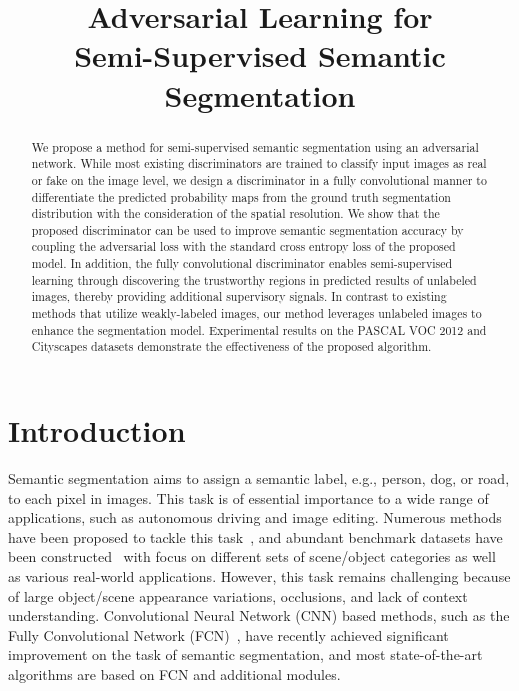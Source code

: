 \documentclass{bmvc2k}
\title{Adversarial Learning for \\
	Semi-Supervised Semantic Segmentation}
\begin{document}
	
	\maketitle
	
	\begin{abstract}
		
		We propose a method for semi-supervised semantic segmentation using an adversarial network.
While most existing discriminators are trained to classify input images as real or fake on the image level, we design a discriminator in a fully convolutional manner to differentiate the predicted probability maps from the ground truth segmentation distribution with the consideration of the spatial resolution.
We show that the proposed discriminator can be used to improve semantic segmentation accuracy by coupling the adversarial loss with the standard cross entropy loss of the proposed model. 
In addition, the fully convolutional discriminator enables semi-supervised learning through discovering the trustworthy regions in predicted results of unlabeled images, thereby providing additional supervisory signals.
In contrast to existing methods that utilize weakly-labeled images, our method leverages unlabeled images to enhance the segmentation model.
Experimental results on the PASCAL VOC 2012 and Cityscapes datasets demonstrate the effectiveness of the proposed algorithm.
	
	\end{abstract}
	
	\section{Introduction}




	
	Semantic segmentation aims to assign a semantic label, e.g., person, dog, or road, to each pixel in images.
This task is of essential importance to a wide range of applications, such as autonomous driving and image editing.
Numerous methods have been proposed to tackle this task~\cite{fcn,crfasrnn,deepparsing,dilated,piecewise,hung2017scene}, and abundant benchmark datasets have been constructed~\cite{pascal, pascal_context, cityscapes, zhou2016semantic}
	with focus on different sets of scene/object categories as well as various real-world applications.
However, this task remains challenging because of large object/scene appearance variations, occlusions, and lack of context understanding.
Convolutional Neural Network (CNN) based methods, such as the Fully Convolutional Network (FCN)~\cite{fcn}, have recently achieved significant improvement on the task of semantic segmentation, and most state-of-the-art algorithms are based on FCN and additional modules.
	
\end{document}
